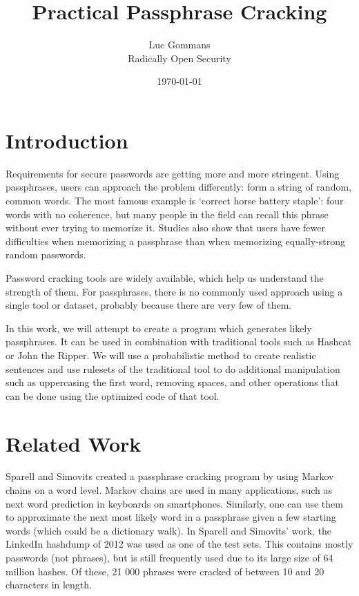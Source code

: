 \documentclass{article}
\begin{document}
\title{Practical Passphrase Cracking}
\date{\today{}}
\author{Luc Gommans \\
	Radically Open Security
}

\maketitle

\section{Introduction}

Requirements for secure passwords are getting more and more stringent. Using
passphrases, users can approach the problem differently: form a string of
random, common words. The most famous example is `correct horse battery
staple': four words with no coherence, but many people in the field can recall
this phrase without ever trying to memorize it\cite{own}. Studies also show
that users have fewer difficulties when memorizing a passphrase than when
memorizing equally-strong random
passwords\cite{behavioral-analysis}\cite{pwd-memorability}.

Password cracking tools are widely available, which help us understand the
strength of them. For passphrases, there is no commonly used approach using a
single tool or dataset, probably because there are very few of them.

In this work, we will attempt to create a program which generates likely
passphrases. It can be used in combination with traditional tools such as
Hashcat or John the Ripper. We will use a probabilistic method to create
realistic sentences and use rulesets of the traditional tool to do additional
manipulation such as uppercasing the first word, removing spaces, and other
operations that can be done using the optimized code of that tool.


\section{Related Work}

Sparell and Simovits\cite{sparell-simovits} created a passphrase cracking
program by using Markov chains on a word level. Markov chains are used in many
applications, such as next word prediction in keyboards on smartphones.
Similarly, one can use them to approximate the next most likely word in a
passphrase given a few starting words (which could be a dictionary walk). In
Sparell and Simovits' work, the LinkedIn hashdump of 2012 was used as one of
the test sets. This contains mostly passwords (not phrases), but is still
frequently used due to its large size of 64 million hashes. Of these, 21 000
phrases were cracked of between 10 and 20 characters in length.
\end{document}
